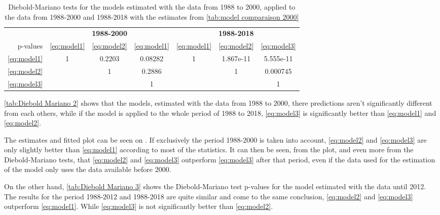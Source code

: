 \documentclass[12pt,a4paper,oneside]{book}
\begin{document}
\begin{table}[htp!]
     \centering \footnotesize
    \begin{tabular}{| r | c c c | c c c |}
 \multicolumn{1}{r}{} &    \multicolumn{3}{c}{\textbf{1988-2000}} &    \multicolumn{3}{c}{\textbf{1988-2018}} \\ \cline{2-7}
 \multicolumn{0}{r|}{p-values}	& \ref{eq:model1} & \ref{eq:model2} & \ref{eq:model1} & \ref{eq:model1} & \ref{eq:model2} & \ref{eq:model3} \\ \cline{1-7}
 \ref{eq:model1} & 1 & 0.2203 & 0.08282  & 1 & 1.867e-11 & 5.555e-11 \\ 
 \ref{eq:model2} &   & 1  	& 0.2886  	&   & 1 & 0.000745 \\
 \ref{eq:model3} &   &    & 1 &   &   & 1   \\ \cline{1-7}
\end{tabular}
    \caption{Diebold-Mariano tests for the models estimated with the data from 1988 to 2000, applied to the data from 1988-2000 and 1988-2018 with the estimates from \autoref{tab:model comparaison 2000}}
    \label{tab:Diebold Mariano 2}
\end{table}

\autoref{tab:Diebold Mariano 2} shows that the models, estimated with the data from 1988 to 2000, there predictions aren't significantly different from each others, while if the model is applied to the whole period of 1988 to 2018, \ref{eq:model3} is significantly better than \ref{eq:model1} and \ref{eq:model2}.

The estimates and fitted plot can be seen on .
If exclusively the period 1988-2000 is taken into account, \ref{eq:model2} and \ref{eq:model3} are only slightly better than \ref{eq:model1} according to most of the statistics.
It can then be seen, from the plot, and even more from the Diebold-Mariano tests, that \ref{eq:model2} and \ref{eq:model3} outperform \ref{eq:model3} after that period, even if the data used for the estimation of the model only uses the data available before 2000.




On the other hand, \autoref{tab:Diebold Mariano 3} shows the Diebold-Mariano test p-values for the model estimated with the data until 2012. The results for the period 1988-2012 and 1988-2018 are quite similar and come to the same conclusion, \ref{eq:model2} and \ref{eq:model3} outperform \ref{eq:model1}. While \ref{eq:model3} is not significantly better than \ref{eq:model2}.
\end{document}
